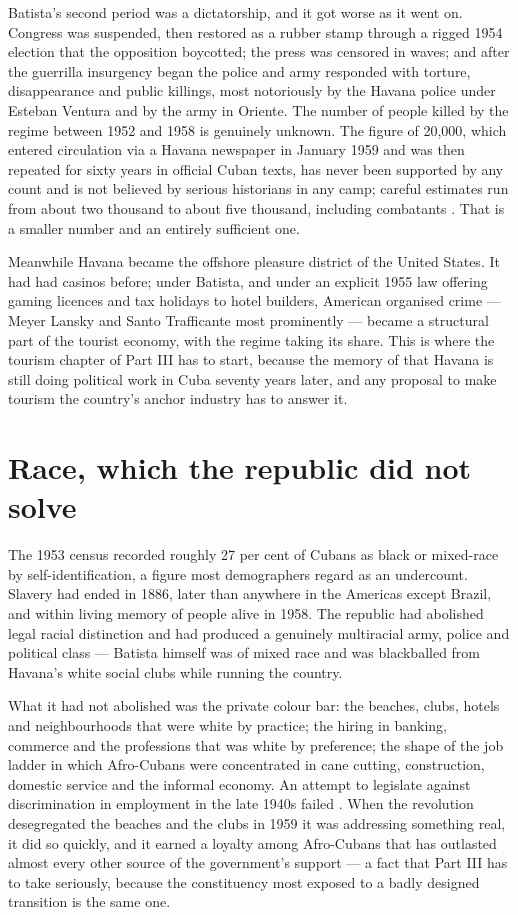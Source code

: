 Batista's second period was a dictatorship, and it got worse as it went on.
Congress was suspended, then restored as a rubber stamp through a rigged 1954
election that the opposition boycotted; the press was censored in waves; and
after the guerrilla insurgency began the police and army responded with
torture, disappearance and public killings, most notoriously by the Havana
police under Esteban Ventura and by the army in Oriente. The number of people
killed by the regime between 1952 and 1958 is genuinely unknown. The figure of
20,000, which entered circulation via a Havana newspaper in January 1959 and
was then repeated for sixty years in official Cuban texts, has never been
supported by any count and is not believed by serious historians in any camp;
careful estimates run from about two thousand to about five thousand, including
combatants \citep{thomas1971}.\unv{} That is a smaller number and an entirely sufficient one.

Meanwhile Havana became the offshore pleasure district of the United States. It
had had casinos before; under Batista, and under an explicit 1955 law offering
gaming licences and tax holidays to hotel builders, American organised crime ---
Meyer Lansky and Santo Trafficante most prominently --- became a structural
part of the tourist economy, with the regime taking its share. This is where the
tourism chapter of Part III has to start, because the memory of that Havana is
still doing political work in Cuba seventy years later, and any proposal to make
tourism the country's anchor industry has to answer it.

\section{Race, which the republic did not solve}

The 1953 census recorded roughly 27 per cent of Cubans as black or
mixed-race by self-identification, a figure most demographers regard as an
undercount.\unv{} Slavery had ended in 1886, later than anywhere in the Americas
except Brazil, and within living memory of people alive in 1958. The republic
had abolished legal racial distinction and had produced a genuinely
multiracial army, police and political class --- Batista himself was of mixed
race and was blackballed from Havana's white social clubs while running the
country.

What it had not abolished was the private colour bar: the beaches, clubs,
hotels and neighbourhoods that were white by practice; the hiring in banking,
commerce and the professions that was white by preference; the shape of the job
ladder in which Afro-Cubans were concentrated in cane cutting, construction,
domestic service and the informal economy. An attempt to legislate against
discrimination in employment in the late 1940s failed \citep{delafuente2001}. When the revolution
desegregated the beaches and the clubs in 1959 it was addressing something
real, it did so quickly, and it earned a loyalty among Afro-Cubans that has
outlasted almost every other source of the government's support --- a fact that
Part III has to take seriously, because the constituency most exposed to a
badly designed transition is the same one.

